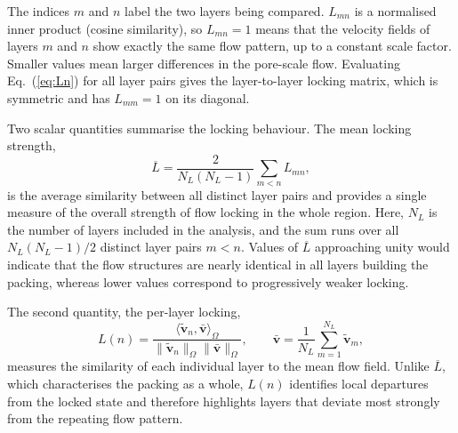 The indices $m$ and $n$ label the two layers being compared. $L_{mn}$ is a normalised inner product (cosine similarity), so $L_{mn}=1$ means that the velocity fields of layers $m$ and $n$ show exactly the same flow pattern, up to a constant scale factor. Smaller values mean larger differences in the pore-scale flow.  Evaluating Eq.~(\ref{eq:Ln}) for all layer pairs gives the layer-to-layer locking matrix, which is symmetric and has $L_{mm}=1$ on its diagonal.

Two scalar quantities summarise the locking behaviour. The mean locking strength,
\begin{equation}
\overline{L}
=
\frac{2}{N_L(N_L-1)}
\sum_{m<n}
L_{mn},
\label{eq:Lbar}
\end{equation}
is the average similarity between all distinct layer pairs and provides a single measure of the overall strength of flow locking in the whole region. Here, $N_L$ is the number of layers included in the analysis, and the sum runs over all $N_L(N_L-1)/2$ distinct layer pairs $m<n$. Values of $\overline{L}$ approaching unity would indicate that the flow structures are nearly identical in all layers building the packing, whereas lower values correspond to progressively weaker locking.

The second quantity, the per-layer locking,
\begin{equation}
L(n)
=
\frac{\langle\tilde{\bm{v}}_n,\bar{\bm{v}}\rangle_{\Omega}}
{\|\tilde{\bm{v}}_n\|_{\Omega}
\|\bar{\bm{v}}\|_{\Omega}},
\qquad
\bar{\bm{v}}
=
\frac{1}{N_L}
\sum_{m=1}^{N_L}
\tilde{\bm{v}}_m,
\label{eq:Lofn}
\end{equation}
measures the similarity of each individual layer to the mean flow field.  Unlike $\overline{L}$, which characterises the packing as a whole, $L(n)$ identifies local departures from the locked state and therefore highlights layers that deviate most strongly from the repeating flow pattern.

